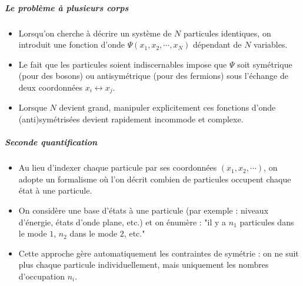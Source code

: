 \subparagraph{Le problème à plusieurs corps}
\begin{itemize}[label = $\bullet$]
\item Lorsqu’on cherche à décrire un système de $N$ particules identiques, on introduit une fonction d’onde $\Psi(x_1, x_2, \cdots, x_N)$ dépendant de $N$ variables.
\item Le fait que les particules soient indiscernables impose que $\Psi$ soit symétrique (pour des bosons) ou antisymétrique (pour des fermions) sous l’échange de deux coordonnées $x_i \leftrightarrow x_j$.
\item Lorsque $N$ devient grand, manipuler explicitement ces fonctions d’onde (anti)symétrisées devient rapidement incommode et complexe.
\end{itemize}

\subparagraph{Seconde quantification}
\begin{itemize}[label = $\bullet$]
\item Au lieu d’indexer chaque particule par ses coordonnées $(x_1, x_2, \cdots)$, on adopte un formalisme où l’on décrit combien de particules occupent chaque état à une particule.
\item On considère une base d’états à une particule (par exemple : niveaux d’énergie, états d’onde plane, etc.) et on énumère : "il y a $n_1$ particules dans le mode $1$, $n_2$ dans le mode $2$, etc."
\item Cette approche gère automatiquement les contraintes de symétrie : on ne suit plus chaque particule individuellement, mais uniquement les nombres d’occupation $n_i$.
\end{itemize}

